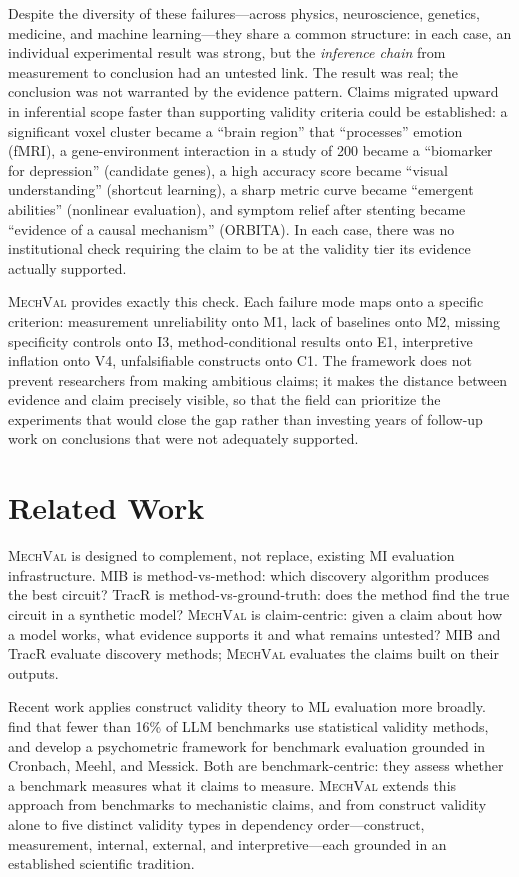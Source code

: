 \documentclass{article}
\newcommand{\mechval}{\textsc{MechVal}}
\begin{document}
Despite the diversity of these failures---across physics, neuroscience, genetics, medicine, and machine learning---they share a common structure: in each case, an individual experimental result was strong, but the \emph{inference chain} from measurement to conclusion had an untested link. The result was real; the conclusion was not warranted by the evidence pattern. Claims migrated upward in inferential scope faster than supporting validity criteria could be established: a significant voxel cluster became a ``brain region'' that ``processes'' emotion (fMRI), a gene-environment interaction in a study of 200 became a ``biomarker for depression'' (candidate genes), a high accuracy score became ``visual understanding'' (shortcut learning), a sharp metric curve became ``emergent abilities'' (nonlinear evaluation), and symptom relief after stenting became ``evidence of a causal mechanism'' (ORBITA). In each case, there was no institutional check requiring the claim to be at the validity tier its evidence actually supported.

\mechval{} provides exactly this check. Each failure mode maps onto a specific criterion: measurement unreliability onto M1, lack of baselines onto M2, missing specificity controls onto I3, method-conditional results onto E1, interpretive inflation onto V4, unfalsifiable constructs onto C1. The framework does not prevent researchers from making ambitious claims; it makes the distance between evidence and claim precisely visible, so that the field can prioritize the experiments that would close the gap rather than investing years of follow-up work on conclusions that were not adequately supported.


\section{Related Work}
\label{sec:related}

\mechval{} is designed to complement, not replace, existing MI evaluation infrastructure. MIB \citep{mueller2025mib} is method-vs-method: which discovery algorithm produces the best circuit? TracR \citep{lindner2024interp} is method-vs-ground-truth: does the method find the true circuit in a synthetic model? \mechval{} is claim-centric: given a claim about how a model works, what evidence supports it and what remains untested? MIB and TracR evaluate discovery methods; \mechval{} evaluates the claims built on their outputs.

Recent work applies construct validity theory to ML evaluation more broadly. \citet{bean2025measuring} find that fewer than 16\% of LLM benchmarks use statistical validity methods, and \citet{freiesleben2025benchmarking} develop a psychometric framework for benchmark evaluation grounded in Cronbach, Meehl, and Messick. Both are benchmark-centric: they assess whether a benchmark measures what it claims to measure. \mechval{} extends this approach from benchmarks to mechanistic claims, and from construct validity alone to five distinct validity types in dependency order---construct, measurement, internal, external, and interpretive---each grounded in an established scientific tradition.
\end{document}
